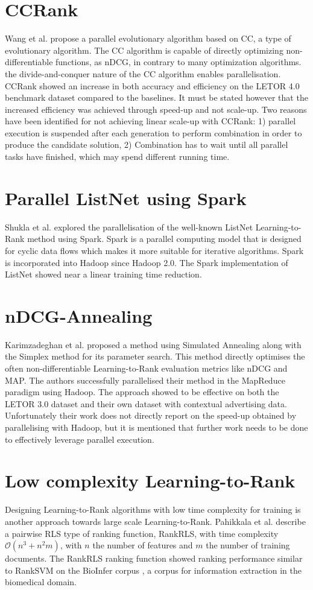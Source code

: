 \section{CCRank}
Wang et al. \cite{Wang2011a,Wang2011b} propose a parallel evolutionary algorithm based on \ac{CC}, a type of evolutionary algorithm. The \ac{CC} algorithm is capable of directly optimizing non-differentiable functions, as \ac{nDCG}, in contrary to many optimization algorithms.  the divide-and-conquer nature of the \ac{CC} algorithm enables parallelisation. CCRank showed an increase in both accuracy and efficiency on the LETOR 4.0 benchmark dataset compared to the baselines. It must be stated however that the increased efficiency was achieved through speed-up and not scale-up. Two reasons have been identified for not achieving linear scale-up with CCRank: 1) parallel execution is suspended after each generation to perform combination in order to produce the candidate solution, 2) Combination has to wait until all parallel tasks have finished, which may spend different running time.
\section{Parallel ListNet using Spark}
Shukla et al. \cite{Shukla2012} explored the parallelisation of the well-known ListNet Learning-to-Rank method using Spark. Spark is a parallel computing model that is designed for cyclic data flows which makes it more suitable for iterative algorithms. Spark is incorporated into Hadoop since Hadoop 2.0. The Spark implementation of ListNet showed near a linear training time reduction.
\section{nDCG-Annealing}
Karimzadeghan et al. \cite{Karimzadehgan2011} proposed a method using Simulated Annealing along with the Simplex method for its parameter search. This method directly optimises the often non-differentiable Learning-to-Rank evaluation metrics like \ac{nDCG} and \ac{MAP}. The authors successfully parallelised their method in the MapReduce paradigm using Hadoop. The approach showed to be effective on both the LETOR 3.0 dataset and their own dataset with contextual advertising data. Unfortunately their work does not directly report on the speed-up obtained by parallelising  with Hadoop, but it is mentioned that further work needs to be done to effectively leverage parallel execution.
\section{Low complexity Learning-to-Rank}
Designing Learning-to-Rank algorithms with low time complexity for training is another approach towards large scale Learning-to-Rank. Pahikkala et al. \cite{Pahikkala2009} describe a pairwise \ac{RLS} type of ranking function, RankRLS, with time complexity $\mathcal{O}(n^3+n^2m)$, with $n$ the number of features and $m$ the number of training documents. The RankRLS ranking function showed ranking performance similar to RankSVM on the BioInfer corpus \cite{Pyysalo2007}, a corpus for information extraction in the biomedical domain.
